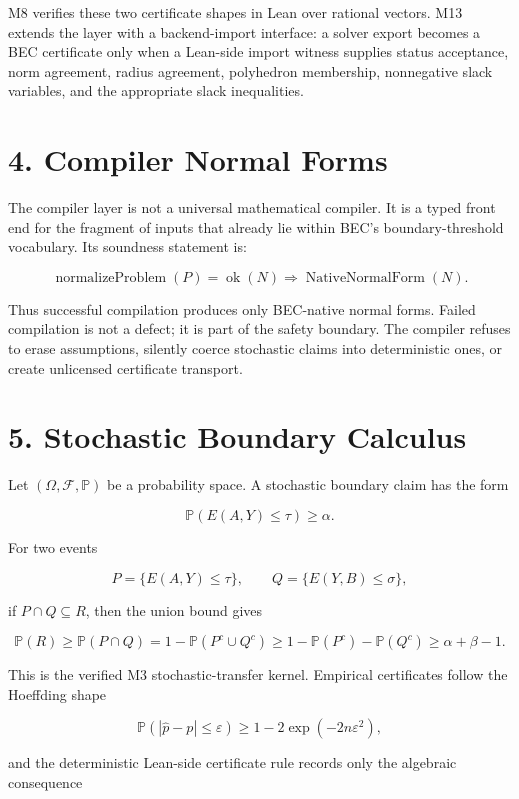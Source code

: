 \documentclass[
  11pt,
]{article}
\begin{document}
M8 verifies these two certificate shapes in Lean over rational vectors.
M13 extends the layer with a backend-import interface: a solver export
becomes a BEC certificate only when a Lean-side import witness supplies
status acceptance, norm agreement, radius agreement, polyhedron
membership, nonnegative slack variables, and the appropriate slack
inequalities.

\section{4. Compiler Normal Forms}\label{compiler-normal-forms}

The compiler layer is not a universal mathematical compiler. It is a
typed front end for the fragment of inputs that already lie within BEC's
boundary-threshold vocabulary. Its soundness statement is:

\[
\operatorname{normalizeProblem}(P)=\operatorname{ok}(N)
\Rightarrow
\operatorname{NativeNormalForm}(N).
\]

Thus successful compilation produces only BEC-native normal forms.
Failed compilation is not a defect; it is part of the safety boundary.
The compiler refuses to erase assumptions, silently coerce stochastic
claims into deterministic ones, or create unlicensed certificate
transport.

\section{5. Stochastic Boundary
Calculus}\label{stochastic-boundary-calculus}

Let \((\Omega,\mathcal F,\mathbb P)\) be a probability space. A
stochastic boundary claim has the form

\[
\mathbb P(E(A,Y)\le \tau)\ge \alpha.
\]

For two events

\[
P=\{E(A,Y)\le \tau\},\qquad Q=\{E(Y,B)\le \sigma\},
\]

if \(P\cap Q\subseteq R\), then the union bound gives

\[
\mathbb P(R)
\ge \mathbb P(P\cap Q)
=1-\mathbb P(P^c\cup Q^c)
\ge 1-\mathbb P(P^c)-\mathbb P(Q^c)
\ge \alpha+\beta-1.
\]

This is the verified M3 stochastic-transfer kernel. Empirical
certificates follow the Hoeffding shape

\[
\mathbb P(|\widehat p-p|\le \varepsilon)\ge 1-2\exp(-2n\varepsilon^2),
\]

and the deterministic Lean-side certificate rule records only the
algebraic consequence
\end{document}
